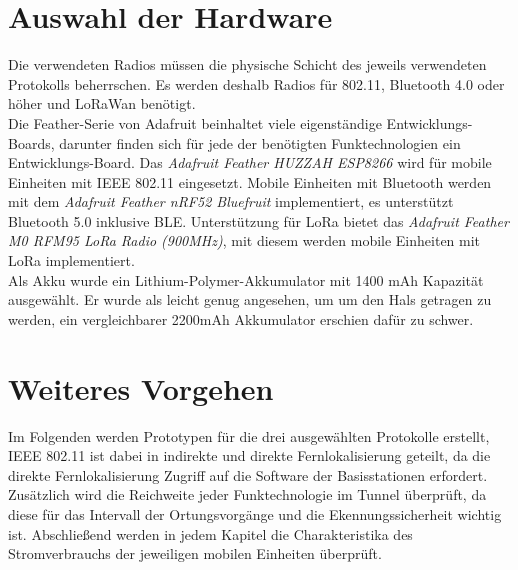 \section{Auswahl der Hardware}
Die verwendeten Radios müssen die physische Schicht des jeweils verwendeten Protokolls beherrschen.
Es werden deshalb Radios für 802.11, Bluetooth 4.0 oder höher und LoRaWan benötigt.\\
Die Feather-Serie von Adafruit beinhaltet viele eigenständige Entwicklungs-Boards, darunter finden sich für jede der benötigten Funktechnologien ein Entwicklungs-Board.
Das \textit{Adafruit Feather HUZZAH ESP8266} wird für mobile Einheiten mit IEEE 802.11 eingesetzt.
Mobile Einheiten mit Bluetooth werden mit dem \textit{Adafruit Feather nRF52 Bluefruit} implementiert, es unterstützt Bluetooth 5.0 inklusive BLE.
Unterstützung für LoRa bietet das \textit{Adafruit Feather M0 RFM95 LoRa Radio (900MHz)}, mit diesem werden mobile Einheiten mit LoRa implementiert.\\
Als Akku wurde ein Lithium-Polymer-Akkumulator mit 1400 mAh Kapazität ausgewählt.
Er wurde als leicht genug angesehen, um um den Hals getragen zu werden, ein vergleichbarer 2200mAh Akkumulator erschien dafür zu schwer.


\section{Weiteres Vorgehen}
Im Folgenden werden Prototypen für die drei ausgewählten Protokolle erstellt, IEEE 802.11 ist dabei in indirekte und direkte Fernlokalisierung geteilt, da die direkte Fernlokalisierung Zugriff auf die Software der Basisstationen erfordert.
Zusätzlich wird die Reichweite jeder Funktechnologie im Tunnel überprüft, da diese für das Intervall der Ortungsvorgänge und die Ekennungssicherheit wichtig ist.
Abschließend werden in jedem Kapitel die Charakteristika des Stromverbrauchs der jeweiligen mobilen Einheiten überprüft.
